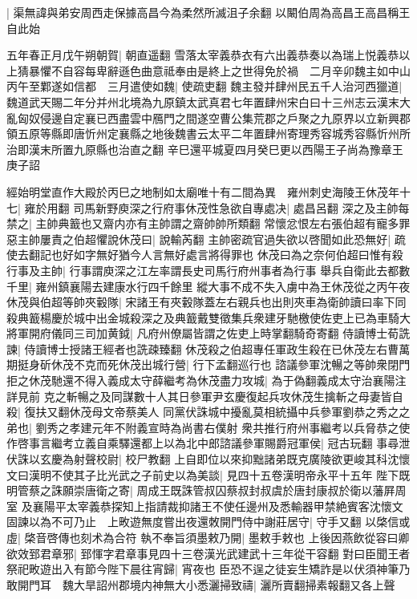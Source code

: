 |{
	渠無諱與弟安周西走保據高昌今為柔然所滅沮子余翻}
以闞伯周為高昌王高昌稱王自此始

五年春正月戊午朔朝賀|{
	朝直遥翻}
雪落太宰義恭衣有六出義恭奏以為瑞上悦義恭以上猜暴懼不自容每卑辭遜色曲意祗奉由是終上之世得免於禍　二月辛卯魏主如中山丙午至鄴遂如信都　三月遣使如魏|{
	使疏吏翻}
魏主發并肆州民五千人治河西獵道|{
	魏道武天賜二年分并州北境為九原鎮太武真君七年置肆州宋白曰十三州志云漢末大亂匈奴侵邊自定襄已西盡雲中鴈門之間遂空曹公集荒郡之戶聚之九原界以立新興郡領五原等縣即唐忻州定襄縣之地後魏書云太平二年置肆州寄理秀容城秀容縣忻州所治即漢末所置九原縣也治直之翻}
辛巳還平城夏四月癸巳更以西陽王子尚為豫章王　庚子詔

經始明堂直作大殿於丙巳之地制如太廟唯十有二間為異　雍州刺史海陵王休茂年十七|{
	雍於用翻}
司馬新野庾深之行府事休茂性急欲自專處决|{
	處昌呂翻}
深之及主帥每禁之|{
	主帥典籖也又齋内亦有主帥謂之齋帥帥所類翻}
常懷忿恨左右張伯超有寵多罪惡主帥屢責之伯超懼說休茂曰|{
	說輸芮翻}
主帥密疏官過失欲以啓聞如此恐無好|{
	疏使去翻記也好如字無好猶今人言無好處言將得罪也}
休茂曰為之奈何伯超曰惟有殺行事及主帥|{
	行事謂庾深之江左率謂長史司馬行府州事者為行事}
舉兵自衛此去都數千里|{
	雍州鎮襄陽去建康水行四千餘里}
縱大事不成不失入虜中為王休茂從之丙午夜休茂與伯超等帥夾轂隊|{
	宋諸王有夾轂隊蓋左右親兵也出則夾車為衛帥讀曰率下同}
殺典籖楊慶於城中出金城殺深之及典籖戴雙徵集兵衆建牙馳檄使佐吏上已為車騎大將軍開府儀同三司加黄鉞|{
	凡府州僚屬皆謂之佐吏上時掌翻騎奇寄翻}
侍讀博士荀詵諫|{
	侍讀博士授諸王經者也詵疎臻翻}
休茂殺之伯超專任軍政生殺在已休茂左右曹萬期挺身斫休茂不克而死休茂出城行營|{
	行下孟翻巡行也}
諮議參軍沈暢之等帥衆閉門拒之休茂馳還不得入義成太守薛繼考為休茂盡力攻城|{
	為于偽翻義成太守治襄陽注詳見前}
克之斬暢之及同謀數十人其日參軍尹玄慶復起兵攻休茂生擒斬之母妻皆自殺|{
	復扶又翻休茂母文帝蔡美人}
同黨伏誅城中擾亂莫相統攝中兵參軍劉恭之秀之之弟也|{
	劉秀之孝建元年不附義宣時為尚書右僕射}
衆共推行府州事繼考以兵脅恭之使作啓事言繼考立義自乘驛還都上以為北中郎諮議參軍賜爵冠軍侯|{
	冠古玩翻}
事尋泄伏誅以玄慶為射聲校尉|{
	校尸教翻}
上自即位以來抑黜諸弟既克廣陵欲更峻其科沈懷文曰漢明不使其子比光武之子前史以為美談|{
	見四十五卷漢明帝永平十五年}
陛下既明管蔡之誅願崇唐衛之寄|{
	周成王既誅管叔囚蔡叔封叔虞於唐封康叔於衛以藩屛周室}
及襄陽平太宰義恭探知上指請裁抑諸王不使任邊州及悉輸器甲禁絶賓客沈懷文固諫以為不可乃止　上畋遊無度嘗出夜還敇開門侍中謝莊居守|{
	守手又翻}
以棨信或虛|{
	棨音啓傳也刻术為合符}
執不奉旨須墨敕乃開|{
	墨敕手敕也}
上後因燕飲從容曰卿欲效郅君章邪|{
	郅惲字君章事見四十三卷漢光武建武十三年從干容翻}
對曰臣聞王者祭祀畋遊出入有節今陛下晨往宵歸|{
	宵夜也}
臣恐不逞之徒妄生矯詐是以伏須神筆乃敢開門耳　魏大旱詔州郡境内神無大小悉灑掃致禱|{
	灑所賣翻掃素報翻又各上聲}
